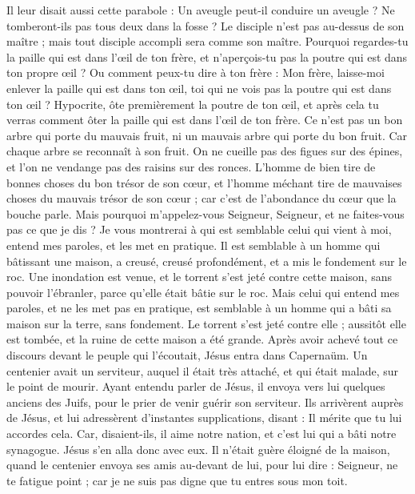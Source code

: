 \begin{multicols}{2}
Il leur disait aussi cette parabole : Un aveugle peut-il conduire un aveugle ? Ne tomberont-ils pas tous deux dans la fosse ?
Le disciple n'est pas au-dessus de son maître ; mais tout disciple accompli sera comme son maître.
Pourquoi regardes-tu la paille qui est dans l'œil de ton frère, et n'aperçois-tu pas la poutre qui est dans ton propre œil ?
Ou comment peux-tu dire à ton frère : Mon frère, laisse-moi enlever la paille qui est dans ton œil, toi qui ne vois pas la poutre qui est dans ton œil ? Hypocrite, ôte premièrement la poutre de ton œil, et après cela tu verras comment ôter la paille qui est dans l'œil de ton frère.
Ce n'est pas un bon arbre qui porte du mauvais fruit, ni un mauvais arbre qui porte du bon fruit.
Car chaque arbre se reconnaît à son fruit. On ne cueille pas des figues sur des épines, et l'on ne vendange pas des raisins sur des ronces.
L'homme de bien tire de bonnes choses du bon trésor de son cœur, et l'homme méchant tire de mauvaises choses du mauvais trésor de son cœur ; car c'est de l'abondance du cœur que la bouche parle.
Mais pourquoi m'appelez-vous Seigneur, Seigneur, et ne faites-vous pas ce que je dis ?
Je vous montrerai à qui est semblable celui qui vient à moi, entend mes paroles, et les met en pratique.
Il est semblable à un homme qui bâtissant une maison, a creusé, creusé profondément, et a mis le fondement sur le roc. Une inondation est venue, et le torrent s'est jeté contre cette maison, sans pouvoir l'ébranler, parce qu'elle était bâtie sur le roc.
Mais celui qui entend mes paroles, et ne les met pas en pratique, est semblable à un homme qui a bâti sa maison sur la terre, sans fondement. Le torrent s'est jeté contre elle ; aussitôt elle est tombée, et la ruine de cette maison a été grande.
\VerseOne{}Après avoir achevé tout ce discours devant le peuple qui l'écoutait, Jésus entra dans Capernaüm.
Un centenier avait un serviteur, auquel il était très attaché, et qui était malade, sur le point de mourir.
Ayant entendu parler de Jésus, il envoya vers lui quelques anciens des Juifs, pour le prier de venir guérir son serviteur.
Ils arrivèrent auprès de Jésus, et lui adressèrent d'instantes supplications, disant : Il mérite que tu lui accordes cela.
Car, disaient-ils, il aime notre nation, et c'est lui qui a bâti notre synagogue.
Jésus s'en alla donc avec eux. Il n'était guère éloigné de la maison, quand le centenier envoya ses amis au-devant de lui, pour lui dire : Seigneur, ne te fatigue point ; car je ne suis pas digne que tu entres sous mon toit.

\end{multicols}
